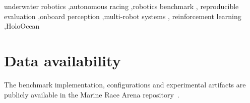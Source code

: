 \documentclass[preprint,3p,times]{elsarticle}
\begin{document}
\begin{frontmatter}
\begin{keyword}
underwater robotics \sep autonomous racing \sep robotics benchmark \sep
reproducible evaluation \sep onboard perception \sep multi-robot systems \sep
reinforcement learning \sep HoloOcean
\end{keyword}

\end{frontmatter}
















\section*{Data availability}
The benchmark implementation, configurations and experimental artifacts are
publicly available in the Marine Race Arena repository~\cite{holodronecompetition2026}.



\end{document}
